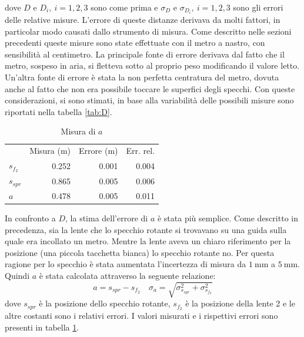 \documentclass[a4paper,11pt]{article}
\begin{document}
	dove $ D $ e $ D_i, \ i=1,2,3 $ sono come prima e $ \sigma_D $ e $ \sigma_{D_i}, \ i=1,2,3 $ sono gli errori delle relative misure. L'errore di queste distanze derivava da molti fattori, in particolar modo causati dallo strumento di misura. Come descritto nelle sezioni precedenti queste misure sono state effettuate con il metro a nastro, con sensibilità al centimetro. La principale fonte di errore derivava dal fatto che il metro, sospeso in aria, si fletteva sotto al proprio peso modificando il valore letto. Un'altra fonte di errore è stata la non perfetta centratura del metro, dovuta anche al fatto che non era possibile toccare le superfici degli specchi.
	Con queste considerazioni, si sono stimati, in base alla variabilità delle possibili misure sono riportati nella tabella \ref{tab:D}.
	
	\begin{table}
		\vspace{-0.5cm}
		\centering
		\caption{Misura di $ a $}
		\vspace{0.1cm}
		\begin{tabular}{lrrr}
			\rowcolor[rgb]{ .741,  .843,  .933}       & \multicolumn{1}{l}{Misura (\si{\meter})} & \multicolumn{1}{l}{Errore (\si{\meter})} & \multicolumn{1}{l}{Err. rel.} \\
			\rowcolor[rgb]{ .741,  .843,  .933} $s_{f_2}$ & \cellcolor[rgb]{ .859,  .859,  .859} 0.252 & \cellcolor[rgb]{ .859,  .859,  .859} 0.001 & \cellcolor[rgb]{ .859,  .859,  .859} 0.004 \\
			\rowcolor[rgb]{ .741,  .843,  .933} $s_{spr}$ & \cellcolor[rgb]{ .929,  .929,  .929} 0.865 & \cellcolor[rgb]{ .929,  .929,  .929} 0.005 & \cellcolor[rgb]{ .929,  .929,  .929} 0.006 \\
			\rowcolor[rgb]{ .741,  .843,  .933} $a$   & \cellcolor[rgb]{ .859,  .859,  .859} 0.478 & \cellcolor[rgb]{ .859,  .859,  .859} 0.005 & \cellcolor[rgb]{ .859,  .859,  .859} 0.011 \\
		\end{tabular}%
		\label{tab:a}%
	\end{table}%
	
	
	In confronto a $ D $, la stima dell'errore di $ a $ è stata più semplice. Come descritto in precedenza, sia la lente che lo specchio rotante si trovavano su una guida sulla quale era incollato un metro. Mentre la lente aveva un chiaro riferimento per la posizione (una piccola tacchetta bianca) lo specchio rotante no. Per questa ragione per lo specchio è stata aumentata l'incertezza di misura da $ \SI{1}{\milli\meter} $ a $ \SI{5}{\milli\meter} $. Quindi $ a $ è stata calcolata attraverso la seguente relazione:
	\begin{equation}\label{eqn:a}
	a = s_{spr} - s_{f_2} \quad \sigma_a = \sqrt{ \sigma_{s_{spr}}^2+\sigma_{s_{f_2}}^2}
	\end{equation}
	dove $ s_{spr} $ è la posizione dello specchio rotante, $ s_{f_2} $ è la posizione della lente 2 e le altre costanti sono i relativi errori. I valori misurati e i rispettivi errori sono presenti in tabella \ref{tab:a}.
	
\end{document}
